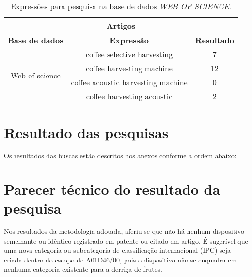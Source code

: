 \begin{table}[!htp]
  \centering
  
  \caption{Expressões para pesquisa na base de dados \emph{WEB OF SCIENCE}.}
  \label{tab:resultado-web-science}
  \begin{tabular}{c c c}
    \hline
    \multicolumn{3}{c}{\large\textbf{Artigos}} \\
    \hline
    \textbf{Base de dados} & \textbf{Expressão} & \textbf{Resultado} \\
    \hline
    \multirow{4}{.2\linewidth}{Web of science} & coffee selective harvesting & 7 \\
    \cline{2-3}
                           & coffee harvesting machine & 12 \\
    \cline{2-3}
                           & coffee acoustic harvesting machine & 0 \\
    \cline{2-3}
                           & coffee harvesting acoustic & 2 \\
    \hline
  \end{tabular}
\end{table}



\chapter{Resultado das pesquisas}
\label{chap:resultado-pesquisa}

Os resultados das buscas estão descritos nos anexos conforme a ordem abaixo:

\begin{Resultados}
\end{Resultados}


\chapter{Parecer técnico do resultado da pesquisa}
\label{chap:parecer-tecnico}

Nos resultados da metodologia adotada, aferiu-se que não há nenhum dispositivo semelhante ou idêntico registrado em patente ou citado em artigo. É sugerível que uma nova categoria ou subcategoria de classificação internacional (IPC) seja criada dentro do escopo de A01D46/00, pois o dispositivo não se enquadra em nenhuma categoria existente para a derriça de frutos.

\AssinaturasResultado


